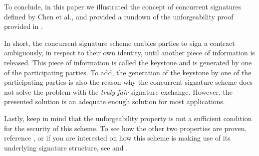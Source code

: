 To conclude, in this paper we illustrated the concept of concurrent signatures defined by Chen et al., and provided a rundown of the unforgeability proof provided in \cite{chen2004concurrent}.

In short, the concurrent signature scheme enables parties to sign a contract ambiguously, in respect to their own identity, until another piece of information is released.
This piece of information is called the keystone and is generated by one of the participating parties.
To add, the generation of the keystone by one of the participating parties is also the reason why the concurrent signature scheme does not solve the problem with the \textit{truly fair} signature exchange.
However, the presented solution is an adequate enough solution for most applications.

Lastly, keep in mind that the unforgeability property is not a sufficient condition for the security of this scheme.
To see how the other two properties are proven, reference \cite{chen2004concurrent}, or if you are interested on how this scheme is making use of its underlying signature structure, see \cite{abe20021} and \cite{schnorr1991efficient}.